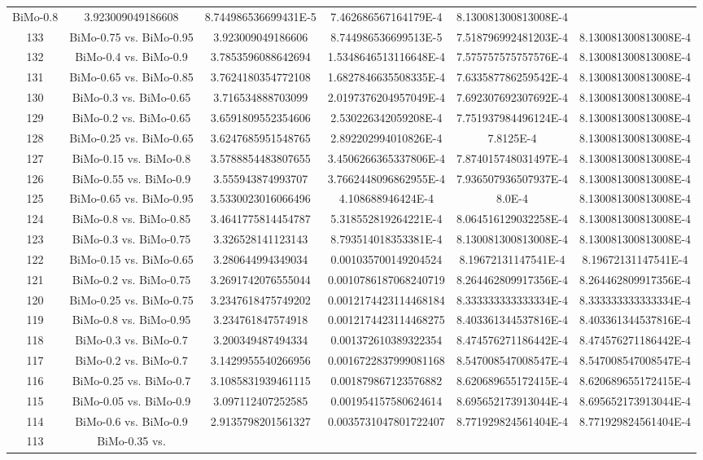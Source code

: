 \documentclass[a4paper,10pt]{article}
\begin{document}
\begin{landscape}
\begin{table}[!htp]
\begin{tabular}{cccccc}
BiMo-0.8&3.923009049186608&8.744986536699431E-5&7.462686567164179E-4&8.130081300813008E-4\\133&BiMo-0.75 vs. BiMo-0.95&3.923009049186606&8.744986536699513E-5&7.518796992481203E-4&8.130081300813008E-4\\132&BiMo-0.4 vs. BiMo-0.9&3.7853596088642694&1.5348646513116648E-4&7.575757575757576E-4&8.130081300813008E-4\\131&BiMo-0.65 vs. BiMo-0.85&3.7624180354772108&1.6827846635508335E-4&7.633587786259542E-4&8.130081300813008E-4\\130&BiMo-0.3 vs. BiMo-0.65&3.716534888703099&2.0197376204957049E-4&7.692307692307692E-4&8.130081300813008E-4\\129&BiMo-0.2 vs. BiMo-0.65&3.6591809552354606&2.530226342059208E-4&7.751937984496124E-4&8.130081300813008E-4\\128&BiMo-0.25 vs. BiMo-0.65&3.6247685951548765&2.892202994010826E-4&7.8125E-4&8.130081300813008E-4\\127&BiMo-0.15 vs. BiMo-0.8&3.5788854483807655&3.4506266365337806E-4&7.874015748031497E-4&8.130081300813008E-4\\126&BiMo-0.55 vs. BiMo-0.9&3.555943874993707&3.7662448096862955E-4&7.936507936507937E-4&8.130081300813008E-4\\125&BiMo-0.65 vs. BiMo-0.95&3.5330023016066496&4.108688946424E-4&8.0E-4&8.130081300813008E-4\\124&BiMo-0.8 vs. BiMo-0.85&3.4641775814454787&5.318552819264221E-4&8.064516129032258E-4&8.130081300813008E-4\\123&BiMo-0.3 vs. BiMo-0.75&3.326528141123143&8.793514018353381E-4&8.130081300813008E-4&8.130081300813008E-4\\122&BiMo-0.15 vs. BiMo-0.65&3.280644994349034&0.001035700149204524&8.19672131147541E-4&8.19672131147541E-4\\121&BiMo-0.2 vs. BiMo-0.75&3.2691742076555044&0.0010786187068240719&8.264462809917356E-4&8.264462809917356E-4\\120&BiMo-0.25 vs. BiMo-0.75&3.2347618475749202&0.0012174423114468184&8.333333333333334E-4&8.333333333333334E-4\\119&BiMo-0.8 vs. BiMo-0.95&3.234761847574918&0.0012174423114468275&8.403361344537816E-4&8.403361344537816E-4\\118&BiMo-0.3 vs. BiMo-0.7&3.200349487494334&0.001372610389322354&8.474576271186442E-4&8.474576271186442E-4\\117&BiMo-0.2 vs. BiMo-0.7&3.1429955540266956&0.0016722837999081168&8.547008547008547E-4&8.547008547008547E-4\\116&BiMo-0.25 vs. BiMo-0.7&3.1085831939461115&0.001879867123576882&8.620689655172415E-4&8.620689655172415E-4\\115&BiMo-0.05 vs. BiMo-0.9&3.097112407252585&0.001954157580624614&8.695652173913044E-4&8.695652173913044E-4\\114&BiMo-0.6 vs. BiMo-0.9&2.9135798201561327&0.0035731047801722407&8.771929824561404E-4&8.771929824561404E-4\\113&BiMo-0.35 vs. 
\end{tabular}
\end{table}
\end{landscape}
\end{document}
